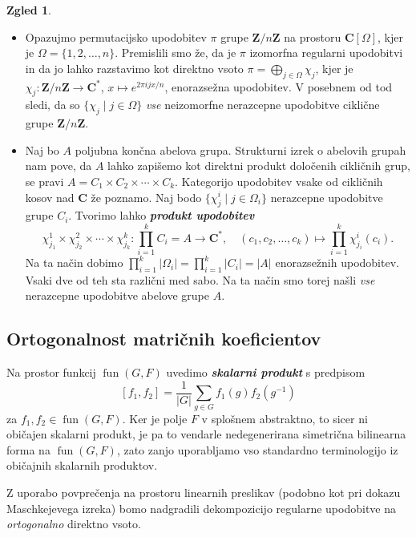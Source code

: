 \documentclass[11pt]{book}
\def\ZZ{\mathbf{Z}}
\def\CC{\mathbf{C}}
\DeclareMathOperator\fun{fun}
\def\definicija{\color{rdeca}\bf\em}
\theoremstyle{definition}
\theoremstyle{zgled}
\newtheorem*{zgled}{Zgled}
\theoremstyle{odprtproblem}
\theoremstyle{domacanaloga}
\theoremstyle{izrek}
\begin{document}
\begin{zgled} \leavevmode
\begin{itemize}
    \item Opazujmo permutacijsko upodobitev $\pi$ grupe $\ZZ/n\ZZ$ na prostoru $\CC[\Omega]$, kjer je $\Omega = \{ 1, 2, \dots, n \}$. Premislili smo že, da je $\pi$ izomorfna regularni upodobitvi in da jo lahko razstavimo kot direktno vsoto $\pi = \bigoplus_{j \in \Omega} \chi_j$, kjer je $\chi_j \colon \ZZ/n\ZZ \to \CC^*$, $x \mapsto e^{2 \pi i j x / n}$, enorazsežna upodobitev. V posebnem od tod sledi, da so $\{ \chi_j \mid j \in \Omega \}$ \emph{vse} neizomorfne nerazcepne upodobitve ciklične grupe $\ZZ/n\ZZ$.

    \item Naj bo $A$ poljubna končna abelova grupa. Strukturni izrek o abelovih grupah nam pove, da $A$ lahko zapišemo kot direktni produkt določenih cikličnih grup, se pravi $A = C_1 \times C_2 \times \cdots \times C_k$. Kategorijo upodobitev vsake od cikličnih kosov nad $\CC$ že poznamo. Naj bodo $\{ \chi^i_j \mid j \in \Omega_i \}$ nerazcepne upodobitve grupe $C_i$. Tvorimo lahko {\definicija produkt upodobitev}
    \[
        \chi^1_{j_1} \times \chi^2_{j_2} \times \cdots \times \chi^k_{j_k} \colon \prod_{i=1}^k C_i = A \to \CC^*, \quad
        (c_1, c_2, \dots, c_k) \mapsto \prod_{i = 1}^k \chi^i_{j_i}(c_i).
    \]
    Na ta način dobimo $\prod_{i=1}^k |\Omega_i| = \prod_{i=1}^k |C_i| = |A|$ enorazsežnih upodobitev. Vsaki dve od teh sta različni med sabo. Na ta način smo torej našli \emph{vse} nerazcepne upodobitve abelove grupe $A$.
\end{itemize}
\end{zgled}

\subsection{Ortogonalnost matričnih koeficientov}

Na prostor funkcij $\fun(G,F)$ uvedimo {\definicija skalarni produkt} s predpisom
\[
    [ f_1, f_2 ] = \frac{1}{|G|} \sum_{g \in G} f_1(g) f_2(g^{-1})
\]
za $f_1, f_2 \in \fun(G,F)$. Ker je polje $F$ v splošnem abstraktno, to sicer ni običajen skalarni produkt, je pa to vendarle nedegenerirana simetrična bilinearna forma na $\fun(G,F)$, zato zanjo uporabljamo vso standardno terminologijo iz običajnih skalarnih produktov.

Z uporabo povprečenja na prostoru linearnih preslikav (podobno kot pri dokazu Maschkejevega izreka) bomo nadgradili dekompozicijo regularne upodobitve na \emph{ortogonalno} direktno vsoto.
\end{document}
